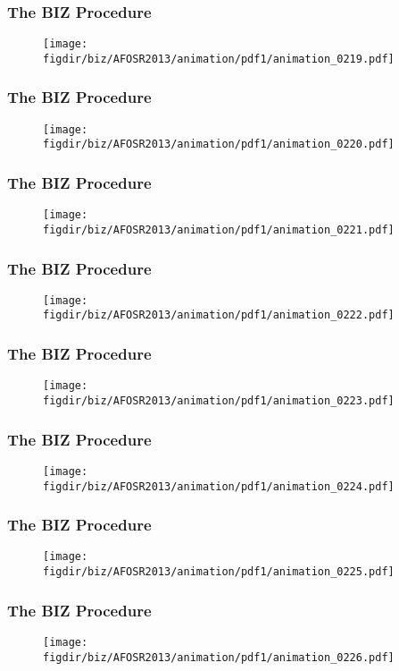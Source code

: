 \documentclass[13pt]{beamer}
\newcommand{\figdir}{../../fig}
\begin{document}
\begin{frame}\frametitle{The BIZ Procedure}\begin{figure}\texttt{[image: \\figdir/biz/AFOSR2013/animation/pdf1/animation\_0219.pdf]}\end{figure}\end{frame}
\begin{frame}\frametitle{The BIZ Procedure}\begin{figure}\texttt{[image: \\figdir/biz/AFOSR2013/animation/pdf1/animation\_0220.pdf]}\end{figure}\end{frame}
\begin{frame}\frametitle{The BIZ Procedure}\begin{figure}\texttt{[image: \\figdir/biz/AFOSR2013/animation/pdf1/animation\_0221.pdf]}\end{figure}\end{frame}
\begin{frame}\frametitle{The BIZ Procedure}\begin{figure}\texttt{[image: \\figdir/biz/AFOSR2013/animation/pdf1/animation\_0222.pdf]}\end{figure}\end{frame}
\begin{frame}\frametitle{The BIZ Procedure}\begin{figure}\texttt{[image: \\figdir/biz/AFOSR2013/animation/pdf1/animation\_0223.pdf]}\end{figure}\end{frame}
\begin{frame}\frametitle{The BIZ Procedure}\begin{figure}\texttt{[image: \\figdir/biz/AFOSR2013/animation/pdf1/animation\_0224.pdf]}\end{figure}\end{frame}
\begin{frame}\frametitle{The BIZ Procedure}\begin{figure}\texttt{[image: \\figdir/biz/AFOSR2013/animation/pdf1/animation\_0225.pdf]}\end{figure}\end{frame}
\begin{frame}\frametitle{The BIZ Procedure}\begin{figure}\texttt{[image: \\figdir/biz/AFOSR2013/animation/pdf1/animation\_0226.pdf]}\end{figure}\end{frame}
\end{document}
